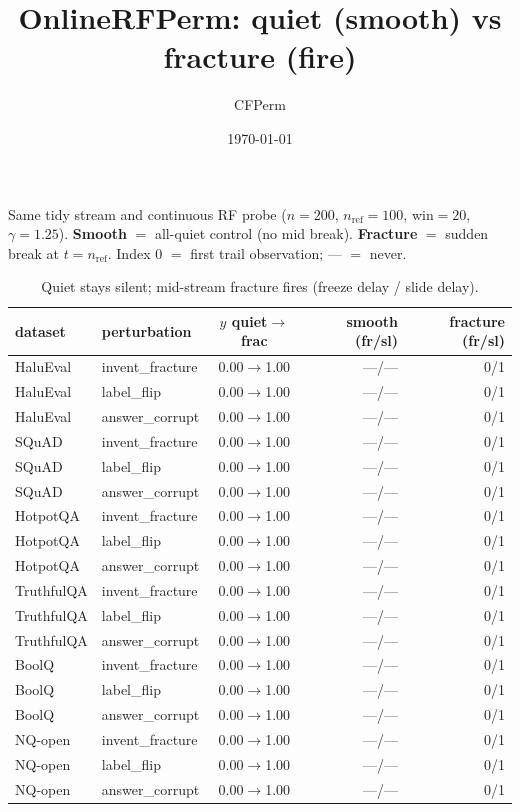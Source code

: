 \documentclass[11pt]{article}
\title{OnlineRFPerm: quiet (smooth) vs fracture (fire)}
\author{CFPerm}
\date{\today}
\begin{document}
\maketitle

\noindent
Same tidy stream and continuous RF probe
($n{=}200$, $n_{\mathrm{ref}}{=}100$, win${=}20$, $\gamma{=}1.25$).
\textbf{Smooth} $=$ all-quiet control (no mid break).
\textbf{Fracture} $=$ sudden break at $t{=}n_{\mathrm{ref}}$.
Index $0$ $=$ first trail observation; --- $=$ never.

\begin{table}[h]
\centering
\caption{Quiet stays silent; mid-stream fracture fires
(freeze delay / slide delay).}
\begin{tabular}{llcrr}
\toprule
dataset & perturbation & $y$ quiet$\to$frac
 & smooth (fr/sl) & fracture (fr/sl) \\
\midrule
HaluEval   & invent\_fracture & 0.00$\to$1.00 & ---/--- & 0/1 \\
HaluEval   & label\_flip      & 0.00$\to$1.00 & ---/--- & 0/1 \\
HaluEval   & answer\_corrupt  & 0.00$\to$1.00 & ---/--- & 0/1 \\
SQuAD      & invent\_fracture & 0.00$\to$1.00 & ---/--- & 0/1 \\
SQuAD      & label\_flip      & 0.00$\to$1.00 & ---/--- & 0/1 \\
SQuAD      & answer\_corrupt  & 0.00$\to$1.00 & ---/--- & 0/1 \\
HotpotQA   & invent\_fracture & 0.00$\to$1.00 & ---/--- & 0/1 \\
HotpotQA   & label\_flip      & 0.00$\to$1.00 & ---/--- & 0/1 \\
HotpotQA   & answer\_corrupt  & 0.00$\to$1.00 & ---/--- & 0/1 \\
TruthfulQA & invent\_fracture & 0.00$\to$1.00 & ---/--- & 0/1 \\
TruthfulQA & label\_flip      & 0.00$\to$1.00 & ---/--- & 0/1 \\
TruthfulQA & answer\_corrupt  & 0.00$\to$1.00 & ---/--- & 0/1 \\
BoolQ      & invent\_fracture & 0.00$\to$1.00 & ---/--- & 0/1 \\
BoolQ      & label\_flip      & 0.00$\to$1.00 & ---/--- & 0/1 \\
BoolQ      & answer\_corrupt  & 0.00$\to$1.00 & ---/--- & 0/1 \\
NQ-open    & invent\_fracture & 0.00$\to$1.00 & ---/--- & 0/1 \\
NQ-open    & label\_flip      & 0.00$\to$1.00 & ---/--- & 0/1 \\
NQ-open    & answer\_corrupt  & 0.00$\to$1.00 & ---/--- & 0/1 \\
\bottomrule
\end{tabular}
\end{table}
\end{document}
